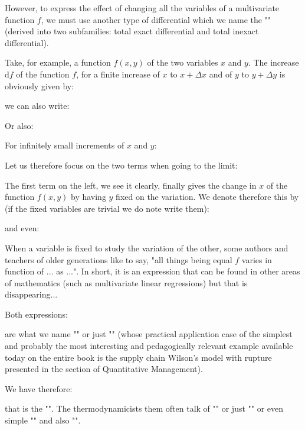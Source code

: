 	However, to express the effect of changing all the variables of a multivariate function $f$, we must use another type of differential which we name the "" (derived into two subfamilies: total exact differential and total inexact differential).
	
	Take, for example, a function $f(x, y)$ of the two variables $x$ and $y$. The increase $\mathrm{d}f$ of the function $f$, for a finite increase of $x$ to $x+\Delta x$ and of $y$ to $y+\Delta y$ is obviously given by:
	
	we can also write:
	
	Or also:
	
	For infinitely small increments of $x$ and $y$:
	
	Let us therefore focus on the two terms when going to the limit:
	
	The first term on the left, we see it clearly, finally gives the change in $x$ of the function $f(x, y)$ by having $y$ fixed on the variation. We denote therefore this by (if the fixed variables are trivial we do note write them):
	
	and even:
	
	\begin{tcolorbox}[title=Remark,colframe=black,arc=10pt]
When a variable is fixed to study the variation of the other, some authors and teachers of older generations like to say, "all things being equal $f$ varies in function of ... as ...". In short, it is an expression that can be found in other areas of mathematics (such as multivariate linear regressions) but that is disappearing...
	\end{tcolorbox}
	Both expressions:
	
	are what we name "" or just "\label{partial derivative}" (whose practical application case of the simplest and probably the most interesting and pedagogically relevant example available today on the entire book is the supply chain Wilson's model with rupture presented in the section of Quantitative Management).
	
	We have therefore:
	
	that is the "". The thermodynamicists them often talk of "\label{total exact differential}" or just "" or even simple "" and also "".
	

